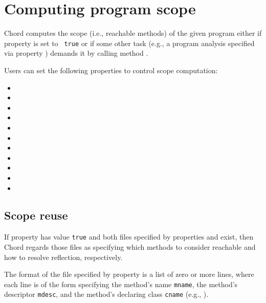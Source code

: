 \section{Computing program scope}
\label{sec:building-scope}

Chord computes the scope (i.e., reachable methods) of the given
program either if property  is set to {\tt
  true} or if some other task (e.g., a program analysis specified via
property ) demands it by calling method
.

Users can set the following properties to control scope computation:

\begin{itemize}
\item {}
\item {}
\item {}
\item {}
\item {}
\item {}
\item {}
\item {}
\item {}
\item {}
\item {}
\end{itemize}

\subsection{Scope reuse}

If property  has value {\tt true} and both
files specified by properties  and
 exist, then Chord regards those files as
specifying which methods to consider reachable and how to resolve
reflection, respectively.

The format of the file specified by property 
is a list of zero or more lines, where each line is of the form
specifying the method's name {\tt mname}, the method's descriptor
{\tt mdesc}, and the method's declaring class {\tt cname} (e.g.,
\code{main:([Ljava/lang/String;)V@foo.bar.Main}).

